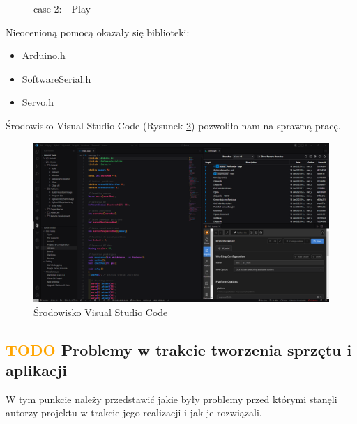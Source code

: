 \documentclass[11pt,titlepage,a4paper]{article}
\begin{document}
\vspace{1cm}

\begin{figure}[h!]
    
    \caption{case 2: - Play}
    \label{casePlay}
\end{figure}

\newpage

Nieocenioną pomocą okazały się biblioteki:

\begin{itemize}
    \item Arduino.h \cite{Arduino_lib}
    \item SoftwareSerial.h \cite{EspSoftwareSerial}
    \item Servo.h \cite{EspServo}
\end{itemize}

\vspace{3cm}

Środowisko Visual Studio Code (Rysunek \ref{vscodepic}) pozwoliło nam na sprawną pracę.

\begin{figure}[h!]
    \begin{center}
        \includegraphics[width=\textwidth]{img/vscode.png}
    \end{center}
    \caption{Środowisko Visual Studio Code}
    \label{vscodepic}
\end{figure}

\newpage

\subsection{\textcolor{orange}{TODO} Problemy w trakcie tworzenia sprzętu i aplikacji}

W tym punkcie należy przedstawić jakie były problemy przed którymi stanęli autorzy projektu w trakcie jego realizacji i jak je rozwiązali.
\end{document}
